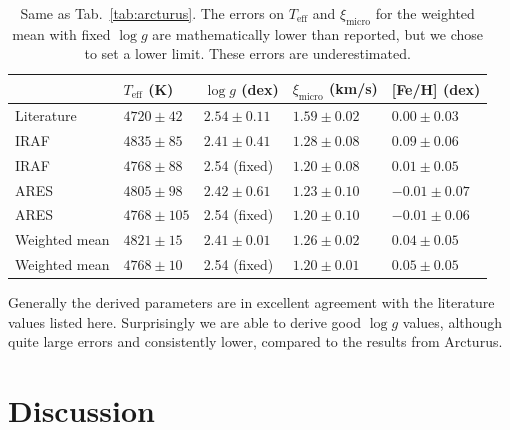 \documentclass{aa}
\begin{document}
\begin{table}[htb!]
    \caption{Same as Tab.~\ref{tab:arcturus}. The errors on $T_\mathrm{eff}$ and
             $\xi_\mathrm{micro}$ for the weighted mean with fixed $\log g$ are
             mathematically lower than reported, but we chose to set a lower
             limit. These errors are underestimated.}
    \label{tab:10Leo}
    \centering
    \begin{tabular}{lllll}
      \hline\hline
                     & $T_\mathrm{eff}$ (K) &  $\log g$ (dex)  &   $\xi_\mathrm{micro}$ (km/s)   & [Fe/H] (dex)     \\
      \hline
        Literature   & $4720 \pm  42$       &  $2.54 \pm 0.11$ &    $1.59 \pm 0.02$              & $ 0.00 \pm 0.03$ \\
      \hline
        IRAF         & $4835 \pm  85$       &  $2.41 \pm 0.41$ &    $1.28 \pm 0.08$              & $ 0.09 \pm 0.06$ \\
        IRAF         & $4768 \pm  88$       &   2.54 (fixed)   &    $1.20 \pm 0.08$              & $ 0.01 \pm 0.05$ \\
      \hline
        ARES         & $4805 \pm  98$       &  $2.42 \pm 0.61$ &    $1.23 \pm 0.10$              & $-0.01 \pm 0.07$ \\
        ARES         & $4768 \pm 105$       &   2.54 (fixed)   &    $1.20 \pm 0.10$              & $-0.01 \pm 0.06$ \\
      \hline
        Weighted mean& $4821 \pm  15$       &  $2.41 \pm 0.01$ &    $1.26 \pm 0.02$              & $ 0.04 \pm 0.05$ \\
        Weighted mean& $4768 \pm  10$       &   2.54 (fixed)   &    $1.20 \pm 0.01$              & $ 0.05 \pm 0.05$ \\
      \hline
    \end{tabular}
\end{table}

Generally the derived parameters are in excellent agreement with the literature
values listed here. Surprisingly we are able to derive good $\log g$ values,
although quite large errors and consistently lower, compared to the results from
Arcturus.



\section{Discussion}
\label{sec:discussion}
\end{document}
